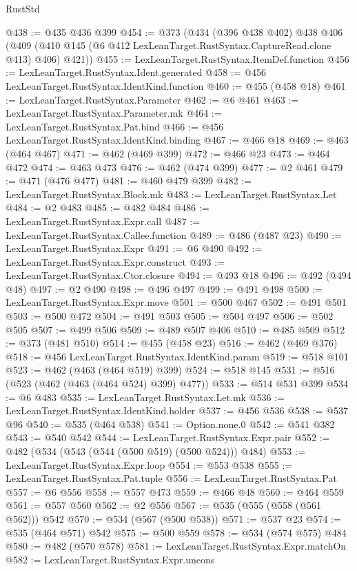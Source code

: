 \begin{lexlean}{RustStd}
\begin{coremodule}
{\begin{coremodule}
{{{{{{{{{{{{{{@438 := @435 @436 @399
@454 := @373
    (@434
      (@396 @438 @402)
      @438
      @406
      (@409 (@410 @145 (@6 @412 LexLeanTarget.RustSyntax.CaptureRead.clone @413) @406) @421))
@455 := LexLeanTarget.RustSyntax.ItemDef.function
@456 := LexLeanTarget.RustSyntax.Ident.generated
@458 := @456 LexLeanTarget.RustSyntax.IdentKind.function
@460 := @455 (@458 @18)
@461 := LexLeanTarget.RustSyntax.Parameter
@462 := @6 @461
@463 := LexLeanTarget.RustSyntax.Parameter.mk
@464 := LexLeanTarget.RustSyntax.Pat.bind
@466 := @456 LexLeanTarget.RustSyntax.IdentKind.binding
@467 := @466 @18
@469 := @463 (@464 @467)
@471 := @462 (@469 @399)
@472 := @466 @23
@473 := @464 @472
@474 := @463 @473
@476 := @462 (@474 @399)
@477 := @2 @461
@479 := @471 (@476 @477)
@481 := @460 @479 @399
@482 := LexLeanTarget.RustSyntax.Block.mk
@483 := LexLeanTarget.RustSyntax.Let
@484 := @2 @483
@485 := @482 @484
@486 := LexLeanTarget.RustSyntax.Expr.call
@487 := LexLeanTarget.RustSyntax.Callee.function
@489 := @486 (@487 @23)
@490 := LexLeanTarget.RustSyntax.Expr
@491 := @6 @490
@492 := LexLeanTarget.RustSyntax.Expr.construct
@493 := LexLeanTarget.RustSyntax.Ctor.closure
@494 := @493 @18
@496 := @492 (@494 @48)
@497 := @2 @490
@498 := @496 @497
@499 := @491 @498
@500 := LexLeanTarget.RustSyntax.Expr.move
@501 := @500 @467
@502 := @491 @501
@503 := @500 @472
@504 := @491 @503
@505 := @504 @497
@506 := @502 @505
@507 := @499 @506
@509 := @489 @507 @406
@510 := @485 @509
@512 := @373 (@481 @510)
@514 := @455 (@458 @23)
@516 := @462 (@469 @376)
@518 := @456 LexLeanTarget.RustSyntax.IdentKind.param
@519 := @518 @101
@523 := @462 (@463 (@464 @519) @399)
@524 := @518 @145
@531 := @516 (@523 (@462 (@463 (@464 @524) @399) @477))
@533 := @514 @531 @399
@534 := @6 @483
@535 := LexLeanTarget.RustSyntax.Let.mk
@536 := LexLeanTarget.RustSyntax.IdentKind.holder
@537 := @456 @536
@538 := @537 @96
@540 := @535 (@464 @538)
@541 := Option.none.{0}
@542 := @541 @382
@543 := @540 @542
@544 := LexLeanTarget.RustSyntax.Expr.pair
@552 := @482 (@534 (@543 (@544 (@500 @519) (@500 @524))) @484)
@553 := LexLeanTarget.RustSyntax.Expr.loop
@554 := @553 @538
@555 := LexLeanTarget.RustSyntax.Pat.tuple
@556 := LexLeanTarget.RustSyntax.Pat
@557 := @6 @556
@558 := @557 @473
@559 := @466 @48
@560 := @464 @559
@561 := @557 @560
@562 := @2 @556
@567 := @535 (@555 (@558 (@561 @562))) @542
@570 := @534 (@567 (@500 @538))
@571 := @537 @23
@574 := @535 (@464 @571) @542
@575 := @500 @559
@578 := @534 (@574 @575) @484
@580 := @482 (@570 @578)
@581 := LexLeanTarget.RustSyntax.Expr.matchOn
@582 := LexLeanTarget.RustSyntax.Expr.uncons
}}}}}}}}}}}}}}
\end{coremodule}}
\end{coremodule}
\end{lexlean}

